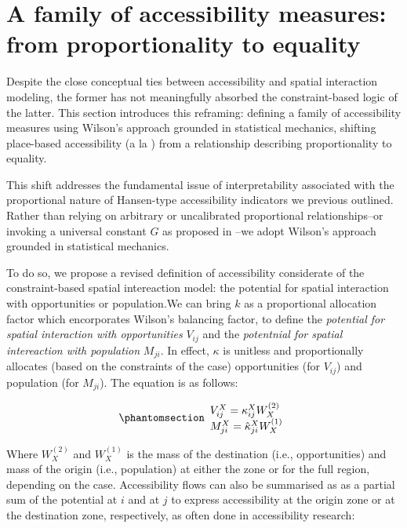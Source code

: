 \documentclass[
  10pt,
  letterpaper,
]{article}
\begin{document}
\section{A family of accessibility measures: from proportionality to
equality}\label{a-family-of-accessibility-measures-from-proportionality-to-equality}

Despite the close conceptual ties between accessibility and spatial
interaction modeling, the former has not meaningfully absorbed the
constraint-based logic of the latter. This section introduces this
reframing: defining a family of accessibility measures using Wilson's
approach grounded in statistical mechanics, shifting place-based
accessibility (a la \citet{hansen1959}) from a relationship describing
proportionality to equality.

This shift addresses the fundamental issue of interpretability
associated with the proportional nature of Hansen-type accessibility
indicators we previous outlined. Rather than relying on arbitrary or
uncalibrated proportional relationships--or invoking a universal
constant \(G\) as proposed in
\citet{stewartDemographicGravitationEvidence1948} --we adopt Wilson's
approach grounded in statistical mechanics.

To do so, we propose a revised definition of accessibility considerate
of the constraint-based spatial intereaction model: the potential for
spatial interaction with opportunities or population.We can bring \(k\)
as a proportional allocation factor which encorporates Wilson's
balancing factor, to define the \emph{potential for spatial interaction
with opportunities} \(V_{ij}\) and the \emph{potentnial for spatial
intereaction with population} \(M_{ji}\). In effect, \(\kappa\) is
unitless and proportionally allocates (based on the constraints of the
case) opportunities (for \(V_{ij}\)) and population (for \(M_{ji}\)).
The equation is as follows:

\begin{equation}\phantomsection\label{eq-access-01}{
\begin{array}{l}
V_{ij}^X = \kappa_{ij}^X W_X^{(2)}\\ 
M_{ji}^X = \hat \kappa_{ji}^X W_X^{(1)}
\end{array}
}\end{equation}

\noindent Where \(W_X^{(2)}\) and \(W_X^{(1)}\) is the mass of the
destination (i.e., opportunities) and mass of the origin (i.e.,
population) at either the zone or for the full region, depending on the
case. Accessibility flows can also be summarised as as a partial sum of
the potential at \(i\) and at \(j\) to express accessibility at the
origin zone or at the destination zone, respectively, as often done in
accessibility research:
\end{document}

